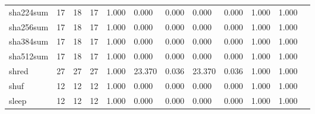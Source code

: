 \begin{longtable}{lp{1.00cm}p{1.00cm}p{1.00cm}p{1.00cm}p{1.00cm}p{1.00cm}p{1.00cm}p{1.00cm}p{1.00cm}p{1.00cm}p{1.00cm}}
sha224sum &                           17 &                 18 &                                17 &                                      1.000 &                                  0.000 &                                        0.000 &                             0.000 &                                   0.000 &                        1.000 &                                        1.000 \\
sha256sum &                           17 &                 18 &                                17 &                                      1.000 &                                  0.000 &                                        0.000 &                             0.000 &                                   0.000 &                        1.000 &                                        1.000 \\
sha384sum &                           17 &                 18 &                                17 &                                      1.000 &                                  0.000 &                                        0.000 &                             0.000 &                                   0.000 &                        1.000 &                                        1.000 \\
sha512sum &                           17 &                 18 &                                17 &                                      1.000 &                                  0.000 &                                        0.000 &                             0.000 &                                   0.000 &                        1.000 &                                        1.000 \\
shred     &                           27 &                 27 &                                27 &                                      1.000 &                                 23.370 &                                        0.036 &                            23.370 &                                   0.036 &                        1.000 &                                        1.000 \\
shuf      &                           12 &                 12 &                                12 &                                      1.000 &                                  0.000 &                                        0.000 &                             0.000 &                                   0.000 &                        1.000 &                                        1.000 \\
sleep     &                           12 &                 12 &                                12 &                                      1.000 &                                  0.000 &                                        0.000 &                             0.000 &                                   0.000 &                        1.000 &                                        1.000 \\

\end{longtable}
